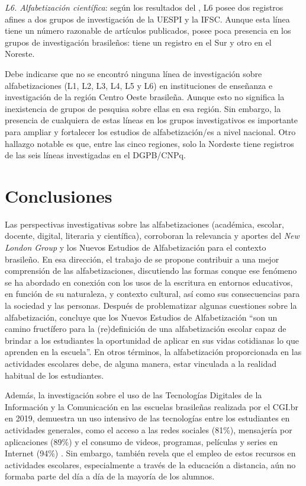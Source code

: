 \documentclass[spanish]{textolivre}
\begin{document}
\textit{L6. Alfabetización científica}: según los resultados del , L6 posee dos registros afines a dos grupos de investigación de la UESPI y la IFSC. Aunque esta línea tiene un número razonable de artículos publicados, posee poca presencia en los grupos de investigación brasileños: tiene un registro en el Sur y otro en el Noreste. 

Debe indicarse que no se encontró ninguna línea de investigación sobre alfabetizaciones (L1, L2, L3, L4, L5 y L6) en instituciones de enseñanza e investigación de la región Centro Oeste brasileña. Aunque esto no significa la inexistencia de grupos de pesquisa sobre ellas en esa región. Sin embargo, la presencia de cualquiera de estas líneas en los grupos investigativos es importante para ampliar y fortalecer los estudios de alfabetización/es a nivel nacional. Otro hallazgo notable es que, entre las cinco regiones, solo la Nordeste tiene registros de las seis líneas investigadas en el DGPB/CNPq.

\section{Conclusiones}\label{sec-conclusiones}
Las perspectivas investigativas sobre las alfabetizaciones (académica, escolar, docente, digital, literaria y científica), corroboran la relevancia y aportes del \textit{New London Group} y los Nuevos Estudios de Alfabetización para el contexto brasileño. En esa dirección, el trabajo de \textcite{terra_letramento_2013} se propone contribuir a una mejor comprensión de las alfabetizaciones, discutiendo las formas conque ese fenómeno se ha abordado en conexión con los usos de la escritura en entornos educativos, en función de su naturaleza, y contexto cultural, así como sus consecuencias para la sociedad y las personas. Después de problematizar algunas cuestiones sobre la alfabetización, \textcite[p. 29]{terra_letramento_2013} concluye que los Nuevos Estudios de Alfabetización “son un camino fructífero para la (re)definición de una alfabetización escolar capaz de brindar a los estudiantes la oportunidad de aplicar en sus vidas cotidianas lo que aprenden en la escuela”. En otros términos, la alfabetización proporcionada en las actividades escolares debe, de alguna manera, estar vinculada a la realidad habitual de los estudiantes.

Además, la investigación sobre el uso de las Tecnologías Digitales de la Información y la Comunicación en las escuelas brasileñas realizada por el CGI.br en 2019, demuestra un uso intensivo de las tecnologías entre los estudiantes en actividades generales, como el acceso a las redes sociales (81\%), mensajería por aplicaciones (89\%) y el consumo de videos, programas, películas y series en Internet (94\%) \cite{comite_gestor_da_internet_no_brasil_resumo_2019}. Sin embargo, también revela que el empleo de estos recursos en actividades escolares, especialmente a través de la educación a distancia, aún no formaba parte del día a día de la mayoría de los alumnos. 
\end{document}
